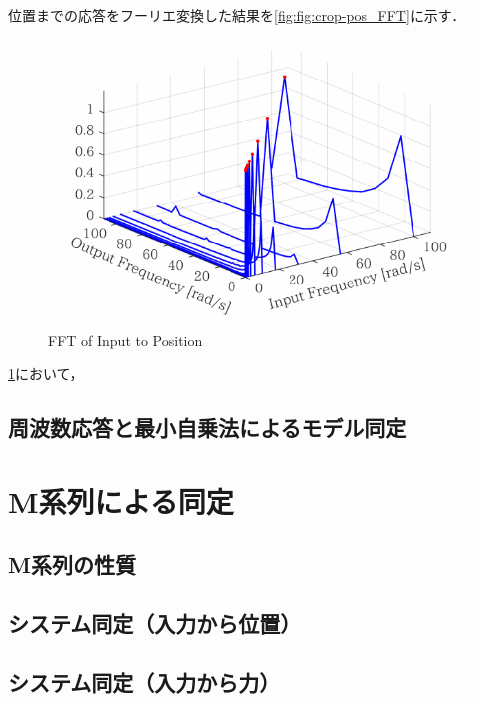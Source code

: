 位置までの応答をフーリエ変換した結果を\figname\ref{fig:fig:crop-pos_FFT}に示す．
\begin{figure}[t]
    \centering
        \includegraphics[keepaspectratio, scale=1.0]{contents/システム同定/figure/crop-pos_FFT.pdf}
        \caption{FFT of Input to Position}
        \label{fig:crop-pos_FFT}
\end{figure}
\figname\ref{fig:crop-pos_FFT}において，
\subsection{周波数応答と最小自乗法によるモデル同定}
\section{M系列による同定}
\subsection{M系列の性質}
\subsection{システム同定（入力から位置）}
\subsection{システム同定（入力から力）}

